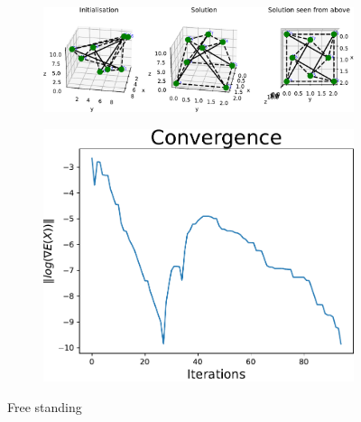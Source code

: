 \begin{figure}[!ht]
\centering
\begin{subfigure}{.72\textwidth}
  \centering
  \includegraphics[width=0.99\linewidth]{Bilder/FREESTANDING.pdf}
\end{subfigure}%
\begin{subfigure}{.3\textwidth}
  \centering
  \includegraphics[width=0.99\linewidth]{Bilder/FREESTANDINGconv.pdf}
  \label{fig:sub2}
\end{subfigure}
\caption{Free standing}
\label{P69}
\end{figure}


